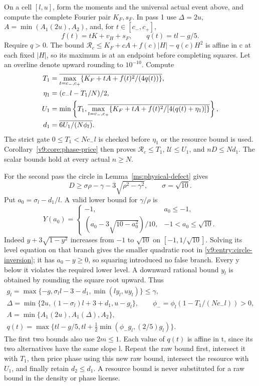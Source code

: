 On a cell $[l,u]$, form the moments and the universal actual event above,
and compute the complete Fourier pair $K_F,s_F$. In pass 1 use
$\Delta=2u$, $A=\min(A_1(2u),A_2)$, and, for $t\in[c_-,c_+]$,
\[
 f(t)=tK+v_H+s_F,\qquad q(t)=tl-g/5.
\]
Require $q>0$. The bound
$\mathcal R_c\le K_F+cA+f(c)|H|-q(c)H^2$ is affine in c at each
fixed $|H|$, so its maximum is at an endpoint before completing squares.
Let an overline denote upward rounding to $10^{-10}$. Compute
\begin{align}
 T_1&=\overline{\max_{t=c_-,c_+}
                     \{K_F+tA+f(t)^2/(4q(t))\}},\notag\\
 \eta_1&=(c_-l-T_1/N)/2,\notag\\
 U_1&=\min\left\{T_1,
       \overline{\max_{t=c_-,c_+}
          \{K_F+tA+f(t)^2/[4(q(t)+\eta_1)]\}}\right\},\notag\\
 d_1&=\overline{6U_1/(N\phi_l)}.\label{v9:entry:first-pass}
\end{align}
The strict gate $0\le T_1<Nc_-l$ is checked before $\eta_1$ or the
resource bound is used. Corollary~\ref{v9:core:phase-price} then proves
$\mathcal R_c\le T_1$, $\mathcal U\le U_1$, and $nD\le Nd_1$.
The scalar bounds hold at every actual $n\ge N$.

For the second pass the circle in Lemma~\ref{ms:physical-defect} gives
\[
 D\ge\sigma\rho-\gamma-3\sqrt{\rho^2-\gamma^2},\qquad\sigma=\sqrt{10}.
\]
Put $a_0=\sigma_l-d_1/l$. A valid lower bound for $\gamma/\rho$ is
\begin{equation}\label{v9:entry:circle-inversion}
 Y(a_0)=\begin{cases}-1,&a_0\le-1,\\
 (a_0-3\sqrt{10-a_0^2})/10,&-1<a_0\le\sqrt{10}.
 \end{cases}
\end{equation}
Indeed $y+3\sqrt{1-y^2}$ increases from $-1$ to $\sqrt{10}$ on
$[-1,1/\sqrt{10}]$. Solving its level equation on that branch gives
the smaller quadratic root in \eqref{v9:entry:circle-inversion};
it has $a_0-y\ge0$, so squaring introduced no false branch. Every y
below it violates the required lower level. A downward rational bound
$y_l$ is obtained by rounding the square root upward. Thus
\begin{gather*}
 g_l=\max\{-g,\sigma_l l-3-d_1,\min(ly_l,uy_l)\}\le\gamma,\\
 \Delta=\min\{2u,(1-\sigma_l)l+3+d_1,u-g_l\},\qquad
 \phi_- =\phi_l(1-T_1/(Nc_-l))>0,\\
 A=\min\{A_1(2u),A_1(\Delta),A_2\},\\
 q(t)=\max\{tl-g/5,tl+\tfrac12\min(\phi_-g_l,(2/5)g_l)\}.
\end{gather*}
The first two bounds also use $2m\le1$. Each value of $q(t)$ is affine
in t, since its two alternatives have the same slope l. Repeat the
raw bound first, intersect it with $T_1$, then price phase using this
new raw bound, intersect the resource with $U_1$, and finally retain
$d_2\le d_1$. A resource bound is never substituted for a raw bound
in the density or phase license.

